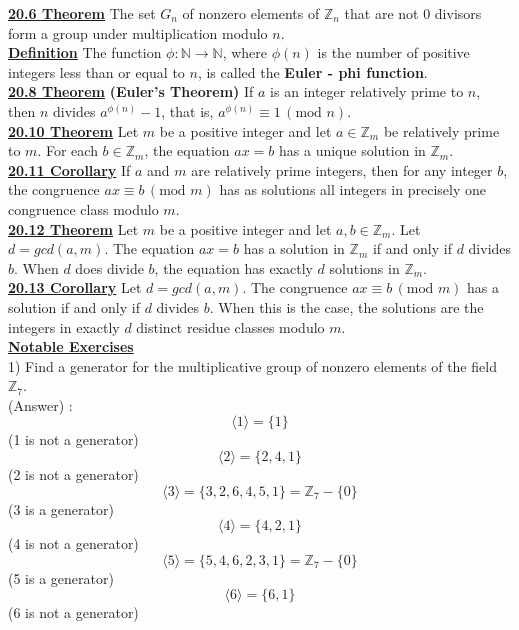 \documentclass[12pt, letterpaper]{article}
\begin{document}
\noindent \underline{\bf 20.6 Theorem} The set $G_n$ of nonzero elements of $\mathbb{Z}_n$ that are not 0 divisors form a group under multiplication modulo $n$. \\

\noindent \underline{\bf Definition}  The function $\phi : \mathbb{N} \rightarrow \mathbb{N}$, where $\phi(n)$ is the number of positive integers less than or equal to $n$, is called the {\bf Euler - phi function}. \\

\noindent \underline{\bf 20.8 Theorem} {\bf(Euler's Theorem)} If $a$ is an integer relatively prime to $n$, then $n$ divides $a^{\phi(n)} - 1$, that is, $a^{\phi(n)} \equiv 1 \, (\mbox{mod } n)$. \\

\noindent \underline{\bf 20.10 Theorem} Let $m$ be a positive integer and let $a \in \mathbb{Z}_m$ be relatively prime to $m$. For each $b \in \mathbb{Z}_m$, the equation $ax = b$ has a unique solution in $\mathbb{Z}_m$. \\

\noindent \underline{\bf 20.11 Corollary} If $a$ and $m$ are relatively prime integers, then for any integer $b$, the congruence $ax \equiv b \, (\mbox{mod } m)$ has as solutions all integers in precisely one congruence class modulo $m$. \\

\noindent \underline{\bf 20.12 Theorem} Let $m$ be a positive integer and let $a,b \in \mathbb{Z}_m$. Let $d = gcd(a,m)$. The equation $ax = b$ has a solution in $\mathbb{Z}_m$ if and only if $d$ divides $b$. When $d$ does divide $b$, the equation has exactly $d$ solutions in $\mathbb{Z}_m$.  \\

\noindent \underline{\bf 20.13 Corollary} Let $d = gcd(a,m)$. The congruence $ax \equiv b \, (\mbox{mod } m)$ has a solution if and only if $d$ divides $b$. When this is the case, the solutions are the integers in exactly $d$ distinct residue classes modulo $m$. \\

\noindent \underline{\bf Notable Exercises} \\

1) Find a generator for the multiplicative group of nonzero elements of the field $\mathbb{Z}_7$. \\

(Answer) : $$\langle 1 \rangle = \{1\} $$
(1 is not a generator)$$ \langle 2 \rangle = \{2,4,1\}$$
(2 is not a generator) $$ \langle 3 \rangle = \{3,2,6,4,5,1\} = \mathbb{Z}_7 - \{0\}$$
(3 is a generator)$$ \langle 4 \rangle = \{4,2,1\}$$
(4 is not a generator) $$ \langle 5 \rangle = \{5,4,6,2,3,1\} = \mathbb{Z}_7 - \{0\}$$
(5 is a generator)$$\langle 6 \rangle = \{6,1\}$$
(6 is not a generator) \\
\end{document}
